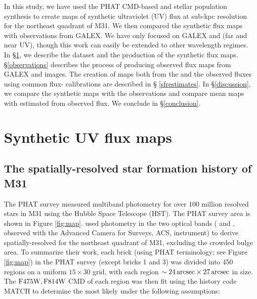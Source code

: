 \documentclass[iop, tighten]{emulateapj}
\begin{document}
In this study, we have used the PHAT CMD-based  and stellar population
synthesis to create maps of synthetic ultraviolet (UV) flux at sub-kpc
resolution for the northeast quadrant of M31. We then compared the synthetic
flux maps with observations from GALEX. We have only focused on GALEX \fuv{}
and \nuv{} (far and near UV), though this work can easily be extended to other
wavelength regimes. In \S \ref{syntheticfluxmaps}, we describe the \sfh{}
dataset and the production of the synthetic flux maps. \S \ref{observations}
describes the process of producing observed flux maps from GALEX \fuv{} and
\nuv{} images. The creation of \sfr{} maps both from the  and the
observed fluxes using common flux-\sfr{} calibrations are described in \S
\ref{sfrestimates}. In \S \ref{discussion}, we compare the synthetic maps with
the observations and compare mean \sfr{} maps with  estimated from
observed flux. We conclude in \S \ref{conclusion}.

\tabfilters





\section{Synthetic UV flux maps}\label{syntheticfluxmaps}



\subsection{The spatially-resolved star formation history of M31}

The PHAT survey \citep{Dalcanton:2012} measured multiband photometry for over
100 million resolved stars in M31 using the Hubble Space Telescope (HST). The
PHAT survey area is shown in Figure \ref{fig:map}. \citet{Lewis:2014} used
photometry in the two optical bands (\acsb{} and \acsi{}, observed with the
Advanced Camera for Surveys, ACS, instrument) to derive spatially-resolved
 for the northeast quadrant of M31, excluding the crowded bulge area. To
summarize their work, each brick (using PHAT terminology; see Figure
\ref{fig:map}) in the PHAT survey (except bricks 1 and 3) was divided into 450
regions on a uniform $15 \times 30$ grid, with each region $\sim 24\,\mathrm{arcsec}
\times 27\,\mathrm{arcsec}$ in size. The $\mathrm{F475W},\mathrm{F814W}$ CMD of each region was then fit
using the \sfh{} history code MATCH \citep{Dolphin:2002} to determine the most
likely \sfh{} under the following assumptions:
\end{document}
